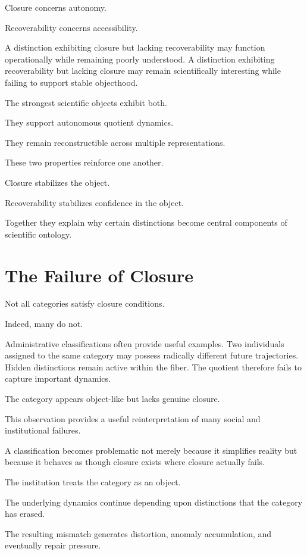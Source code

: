 \documentclass[11pt,oneside,openany]{book}
\begin{document}
Closure concerns autonomy.

Recoverability concerns accessibility.

A distinction exhibiting closure but lacking recoverability may function operationally while remaining poorly understood. A distinction exhibiting recoverability but lacking closure may remain scientifically interesting while failing to support stable objecthood.

The strongest scientific objects exhibit both.

They support autonomous quotient dynamics.

They remain reconstructible across multiple representations.

These two properties reinforce one another.

Closure stabilizes the object.

Recoverability stabilizes confidence in the object.

Together they explain why certain distinctions become central components of scientific ontology.

\section{The Failure of Closure}

Not all categories satisfy closure conditions.

Indeed, many do not.

Administrative classifications often provide useful examples. Two individuals assigned to the same category may possess radically different future trajectories. Hidden distinctions remain active within the fiber. The quotient therefore fails to capture important dynamics.

The category appears object-like but lacks genuine closure.

This observation provides a useful reinterpretation of many social and institutional failures.

A classification becomes problematic not merely because it simplifies reality but because it behaves as though closure exists where closure actually fails.

The institution treats the category as an object.

The underlying dynamics continue depending upon distinctions that the category has erased.

The resulting mismatch generates distortion, anomaly accumulation, and eventually repair pressure.
\end{document}
